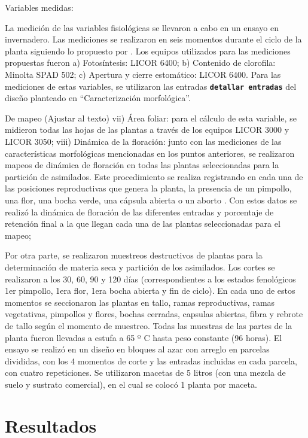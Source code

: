 \documentclass[12pt,oneside]{reedthesis}
\begin{document}
Variables medidas:

La medición de las variables fisiológicas se llevaron a cabo en un ensayo en invernadero. Las mediciones se realizaron en seis momentos durante el ciclo de la planta siguiendo lo propuesto por \autocite{luo2017}. Los equipos utilizados para las mediciones propuestas fueron a) Fotosíntesis: LICOR 6400; b) Contenido de clorofila: Minolta SPAD 502; c) Apertura y cierre estomático: LICOR 6400. Para las mediciones de estas variables, se utilizaron las entradas \textbf{\texttt{detallar\ entradas}} del diseño planteado en ``Caracterización morfológica''.

De mapeo (Ajustar al texto) vii) Área foliar: para el cálculo de esta variable, se midieron todas las hojas de las plantas a través de los equipos LICOR 3000 y LICOR 3050; viii) Dinámica de la floración: junto con las mediciones de las características morfológicas mencionadas en los puntos anteriores, se realizaron mapeos de dinámica de floración en todas las plantas seleccionadas para la partición de asimilados. Este procedimiento se realiza registrando en cada una de las posiciones reproductivas que genera la planta, la presencia de un pimpollo, una flor, una bocha verde, una cápsula abierta o un aborto \autocite{kerby1996monitoring}. Con estos datos se realizó la dinámica de floración de las diferentes entradas y porcentaje de retención final a la que llegan cada una de las plantas seleccionadas para el mapeo;

Por otra parte, se realizaron muestreos destructivos de plantas para la determinación de materia seca y partición de los asimilados. Los cortes se realizaron a los 30, 60, 90 y 120 días (correspondientes a los estados fenológicos 1er pimpollo, 1era flor, 1era bocha abierta y fin de ciclo). En cada uno de estos momentos se seccionaron las plantas en tallo, ramas reproductivas, ramas vegetativas, pimpollos y flores, bochas cerradas, capsulas abiertas, fibra y rebrote de tallo según el momento de muestreo. Todas las muestras de las partes de la planta fueron llevadas a estufa a 65 º C hasta peso constante (96 horas). El ensayo se realizó en un diseño en bloques al azar con arreglo en parcelas divididas, con los 4 momentos de corte y las entradas incluidas en cada parcela, con cuatro repeticiones. Se utilizaron macetas de 5 litros (con una mezcla de suelo y sustrato comercial), en el cual se colocó 1 planta por maceta.

\section{Resultados}\label{resultados-1}
\end{document}
